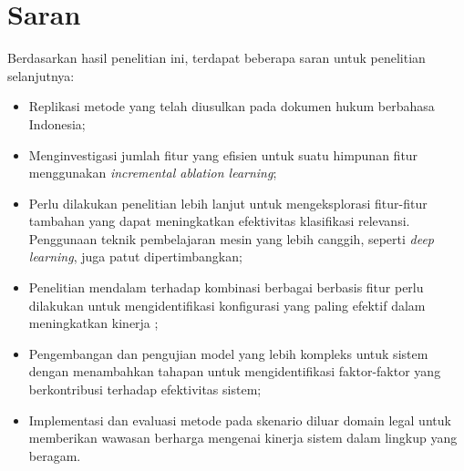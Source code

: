 \section{Saran}
\label{subbab:saran}
Berdasarkan hasil penelitian ini, terdapat beberapa saran untuk penelitian selanjutnya:
\begin{itemize}
\item Replikasi metode yang telah diusulkan pada dokumen hukum berbahasa Indonesia;
\item Menginvestigasi jumlah fitur yang efisien untuk suatu himpunan fitur menggunakan \textit{incremental ablation learning};
\item Perlu dilakukan penelitian lebih lanjut untuk mengeksplorasi fitur-fitur tambahan yang dapat meningkatkan efektivitas klasifikasi relevansi. Penggunaan teknik pembelajaran mesin yang lebih canggih, seperti \textit{deep learning}, juga patut dipertimbangkan;
\item Penelitian mendalam terhadap kombinasi berbagai \reranker{} berbasis fitur perlu dilakukan untuk mengidentifikasi konfigurasi yang paling efektif dalam meningkatkan kinerja \retriever{};
\item Pengembangan dan pengujian model yang lebih kompleks untuk sistem \cascaded{} \ir{} dengan menambahkan tahapan \ranking{} untuk mengidentifikasi faktor-faktor yang berkontribusi terhadap efektivitas sistem;
\item Implementasi dan evaluasi metode pada skenario diluar domain legal untuk memberikan wawasan berharga mengenai kinerja sistem dalam lingkup yang beragam.
\end{itemize}







